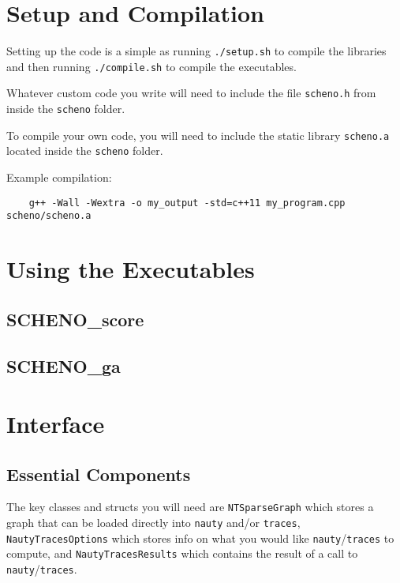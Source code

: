 \documentclass{article}
\begin{document}
\newpage

\section{Setup and Compilation}\label{sec:setup}

Setting up the code is a simple as running \verb|./setup.sh| to compile the libraries and then running \verb|./compile.sh| to compile the executables.

Whatever custom code you write will need to include the file \verb|scheno.h| from inside the \verb|scheno| folder.

To compile your own code, you will need to include the static library \verb|scheno.a| located inside the \verb|scheno| folder.

Example compilation:

\begin{verbatim}
    g++ -Wall -Wextra -o my_output -std=c++11 my_program.cpp scheno/scheno.a
\end{verbatim}

\newpage

\section{Using the Executables}\label{sec:binaries}

\subsection{SCHENO\_score}

\subsection{SCHENO\_ga}

\newpage

\section{Interface}\label{sec:interface}

\subsection{Essential Components}

The key classes and structs you will need are \verb|NTSparseGraph| which stores a graph that can be loaded directly into \verb|nauty| and/or \verb|traces|, \verb|NautyTracesOptions| which stores info on what you would like \verb|nauty|/\verb|traces| to compute, and \verb|NautyTracesResults| which contains the result of a call to \verb|nauty|/\verb|traces|.
\end{document}
